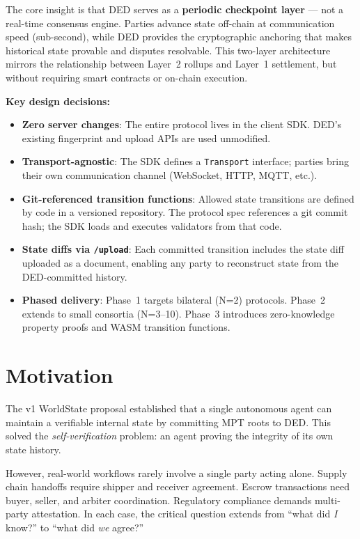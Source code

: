\documentclass[11pt,a4paper]{article}
\begin{document}
The core insight is that DED serves as a \textbf{periodic checkpoint layer}
--- not a real-time consensus engine. Parties advance state off-chain at
communication speed (sub-second), while DED provides the cryptographic anchoring
that makes historical state provable and disputes resolvable. This two-layer
architecture mirrors the relationship between Layer~2 rollups and Layer~1
settlement, but without requiring smart contracts or on-chain execution.

\textbf{Key design decisions:}
\begin{itemize}[nosep]
  \item \textbf{Zero server changes}: The entire protocol lives in the client
    SDK. DED's existing fingerprint and upload APIs are used unmodified.
  \item \textbf{Transport-agnostic}: The SDK defines a \texttt{Transport}
    interface; parties bring their own communication channel (WebSocket, HTTP,
    MQTT, etc.).
  \item \textbf{Git-referenced transition functions}: Allowed state transitions
    are defined by code in a versioned repository. The protocol spec references
    a git commit hash; the SDK loads and executes validators from that code.
  \item \textbf{State diffs via \texttt{/upload}}: Each committed transition
    includes the state diff uploaded as a document, enabling any party to
    reconstruct state from the DED-committed history.
  \item \textbf{Phased delivery}: Phase~1 targets bilateral (N=2) protocols.
    Phase~2 extends to small consortia (N=3--10). Phase~3 introduces
    zero-knowledge property proofs and WASM transition functions.
\end{itemize}


\section{Motivation}

The v1 WorldState proposal established that a single autonomous agent can
maintain a verifiable internal state by committing MPT roots to DED. This
solved the \emph{self-verification} problem: an agent proving the integrity of
its own state history.

However, real-world workflows rarely involve a single party acting alone.
Supply chain handoffs require shipper and receiver agreement. Escrow
transactions need buyer, seller, and arbiter coordination. Regulatory
compliance demands multi-party attestation. In each case, the critical question
extends from ``what did \emph{I} know?'' to ``what did \emph{we} agree?''
\end{document}
